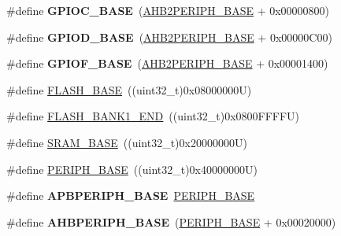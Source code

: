 \begin{DoxyCompactItemize}
\mbox{\label{group___peripheral__memory__map_ga26f267dc35338eef219544c51f1e6b3f}} 
\#define {\bfseries G\+P\+I\+O\+C\+\_\+\+B\+A\+SE}~(\hyperlink{group___peripheral__memory__map_gaeedaa71d22a1948492365e2cd26cfd46}{A\+H\+B2\+P\+E\+R\+I\+P\+H\+\_\+\+B\+A\+SE} + 0x00000800)
\item 
\mbox{\label{group___peripheral__memory__map_ga1a93ab27129f04064089616910c296ec}} 
\#define {\bfseries G\+P\+I\+O\+D\+\_\+\+B\+A\+SE}~(\hyperlink{group___peripheral__memory__map_gaeedaa71d22a1948492365e2cd26cfd46}{A\+H\+B2\+P\+E\+R\+I\+P\+H\+\_\+\+B\+A\+SE} + 0x00000\+C00)
\item 
\mbox{\label{group___peripheral__memory__map_ga7f9a3f4223a1a784af464a114978d26e}} 
\#define {\bfseries G\+P\+I\+O\+F\+\_\+\+B\+A\+SE}~(\hyperlink{group___peripheral__memory__map_gaeedaa71d22a1948492365e2cd26cfd46}{A\+H\+B2\+P\+E\+R\+I\+P\+H\+\_\+\+B\+A\+SE} + 0x00001400)
\item 
\#define \hyperlink{group___peripheral__memory__map_ga23a9099a5f8fc9c6e253c0eecb2be8db}{F\+L\+A\+S\+H\+\_\+\+B\+A\+SE}~((uint32\+\_\+t)0x08000000\+U)
\item 
\#define \hyperlink{group___peripheral__memory__map_ga443a2786535d83e32dfdc2b29e379332}{F\+L\+A\+S\+H\+\_\+\+B\+A\+N\+K1\+\_\+\+E\+ND}~((uint32\+\_\+t)0x0800\+F\+F\+F\+F\+U)
\item 
\#define \hyperlink{group___peripheral__memory__map_ga05e8f3d2e5868754a7cd88614955aecc}{S\+R\+A\+M\+\_\+\+B\+A\+SE}~((uint32\+\_\+t)0x20000000\+U)
\item 
\#define \hyperlink{group___peripheral__memory__map_ga9171f49478fa86d932f89e78e73b88b0}{P\+E\+R\+I\+P\+H\+\_\+\+B\+A\+SE}~((uint32\+\_\+t)0x40000000\+U)
\item 
\mbox{\label{group___peripheral__memory__map_gac85f31889eb6a3f651b563bbc7131f91}} 
\#define {\bfseries A\+P\+B\+P\+E\+R\+I\+P\+H\+\_\+\+B\+A\+SE}~\hyperlink{group___peripheral__memory__map_ga9171f49478fa86d932f89e78e73b88b0}{P\+E\+R\+I\+P\+H\+\_\+\+B\+A\+SE}
\item 
\mbox{\label{group___peripheral__memory__map_ga92eb5d49730765d2abd0f5b09548f9f5}} 
\#define {\bfseries A\+H\+B\+P\+E\+R\+I\+P\+H\+\_\+\+B\+A\+SE}~(\hyperlink{group___peripheral__memory__map_ga9171f49478fa86d932f89e78e73b88b0}{P\+E\+R\+I\+P\+H\+\_\+\+B\+A\+SE} + 0x00020000)

\end{DoxyCompactItemize}
